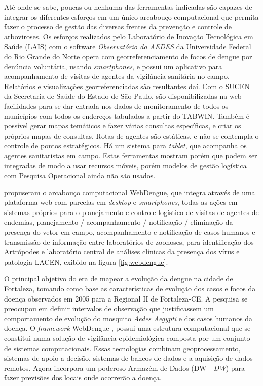Até onde se sabe, poucas ou nenhuma das ferramentas indicadas são capazes de integrar os diferentes esforços em um único arcabouço computacional que permita fazer o processo de gestão das diversas frentes da prevenção e controle de arboviroses. Os esforços realizados pelo Laboratório de Inovação Tecnológica em Saúde (LAIS) com o software \emph{Observatório do AEDES} da Universidade Federal do Rio Grande do Norte opera com georreferenciamento de focos de dengue por denúncia voluntária, usando \emph{smartphones}, e possui um aplicativo para acompanhamento de visitas de agentes da vigilância sanitária no campo. Relatórios e visualizações georreferenciadas são resultantes daí. Com o SUCEN da Secretaria de Saúde do Estado de São Paulo, são disponibilizadas na web facilidades para se dar entrada nos dados de monitoramento de todos os municípios com todos os endereços tabulados a partir do TABWIN. Também é possível gerar mapas temáticos e fazer várias consultas específicas, e criar os próprios mapas de consultas. Rotas de agentes são estáticas, e não se contempla o controle de pontos estratégicos. Há um sistema para \emph{tablet}, que acompanha os agentes sanitaristas em campo. Estas ferramentas mostram porém que podem ser integradas de modo a usar recursos móveis, porém modelos de gestão logística com Pesquisa Operacional ainda não são usados. 

 propuseram o arcabouço computacional WebDengue, que integra através de uma plataforma web com parcelas em \emph{desktop} e \emph{smartphones}, todas as ações em sistemas próprios para o planejamento e controle logístico de visitas de agentes de endemias, planejamento / acompanhamento / notificação / eliminação da presença do vetor em campo, acompanhamento e notificação de casos humanos e transmissão de informação entre laboratórios de zoonoses, para identificação dos Artrópodes e laboratório central de análises clínicas da presença dos vírus e patologia \acrshort{LACEN}, exibido na figura \ref{fig:webdengue}.

O principal objetivo do  era de mapear a evolução da dengue na cidade de Fortaleza, tomando como base as características de evolução dos casos e focos da doença observados em 2005 para a Regional II de Fortaleza-CE. A pesquisa se preocupou em definir intervalos de observação que justificassem um comportamento de evolução do mosquito \emph{Aedes Aegypti} e dos casos humanos da doença. O \textit{framework} WebDengue \cite{webdengue2008}, possui uma estrutura computacional que se constitui numa solução de vigilância epidemiológica composta por um conjunto de sistemas computacionais. Essas tecnologias combinam geoprocessamento, sistemas de apoio a decisão, sistemas de bancos de dados e a aquisição de dados remotos. Agora incorpora um poderoso Armazém de Dados (\acrshort{DW} - \textit{\acrlong{DW}}) para fazer previsões dos locais onde ocorrerão a doença.

